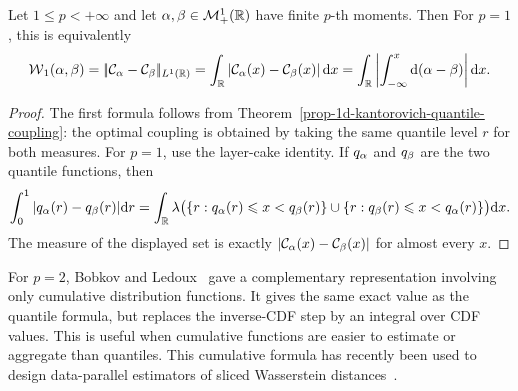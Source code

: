 \begin{prop}\label{prop-wass-quantile-1d}
	Let $1\leq p<+\infty$ and let $\alpha,\beta\in\mathcal{M}_+^1(\mathbb{R})$ have finite $p$-th moments. Then
	For $p=1$, this is equivalently
		\begin{equation}\label{eq-w1-1d}
			\operatorname{\mathcal{W}}_1(\alpha,\beta)
			=
			|\!| \mathcal{C}_{\alpha}-\mathcal{C}_{\beta} |\!|_{L^1(\mathbb{R})}
			=
			\int_{\mathbb{R}} \left\lvert\mathcal{C}_{\alpha}(x)-\mathcal{C}_{\beta}(x)\right\rvert\mathrm{d} x
			=
			\int_{\mathbb{R}} \left\lvert\int_{-\infty}^x\mathrm{d}(\alpha-\beta)\right\rvert\mathrm{d} x.
		\end{equation}
\end{prop}
\begin{proof}
	The first formula follows from Theorem~\ref{prop-1d-kantorovich-quantile-coupling}: the optimal coupling is obtained by taking the same quantile level $r$ for both measures. For $p=1$, use the layer-cake identity. If $q_\alpha$ and $q_\beta$ are the two quantile functions, then
	\[
		\int_0^1 |q_\alpha(r)-q_\beta(r)|\mathrm{d} r
		=
		\int_{\mathbb{R}}
		\lambda\bigl(\{r:q_\alpha(r)\leqslant x<q_\beta(r)\}\cup\{r:q_\beta(r)\leqslant x<q_\alpha(r)\}\bigr)\mathrm{d} x.
	\]
	The measure of the displayed set is exactly $|\mathcal{C}_{\alpha}(x)-\mathcal{C}_{\beta}(x)|$ for almost every $x$.
\end{proof}

For $p=2$, Bobkov and Ledoux~\cite{BobkovLedoux2019EmpiricalKantorovich} gave a complementary representation involving only cumulative distribution functions. It gives the same exact value as the quantile formula, but replaces the inverse-CDF step by an integral over CDF values. This is useful when cumulative functions are easier to estimate or aggregate than quantiles. This cumulative formula has recently been used to design data-parallel estimators of sliced Wasserstein distances~\cite{VauthierMerigotKorba2026CDFSW}.

